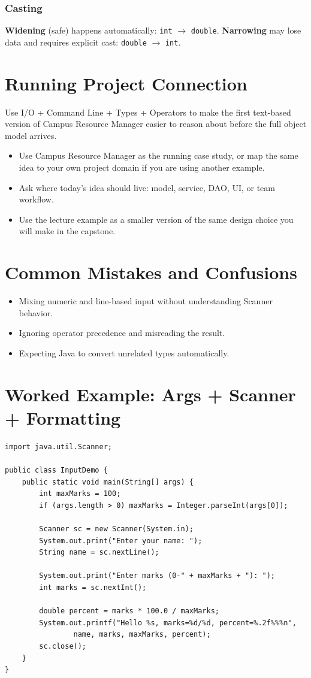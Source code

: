 \documentclass[11pt]{article}
\begin{document}
\subsubsection{Casting}
\textbf{Widening} (safe) happens automatically: \texttt{int} $\rightarrow$ \texttt{double}.
\textbf{Narrowing} may lose data and requires explicit cast: \texttt{double} $\rightarrow$ \texttt{int}.

\section{Running Project Connection}
Use I/O + Command Line + Types + Operators to make the first text-based version of Campus Resource Manager easier to reason about before the full object model arrives.
\begin{itemize}
  \item Use Campus Resource Manager as the running case study, or map the same idea to your own project domain if you are using another example.
  \item Ask where today's idea should live: model, service, DAO, UI, or team workflow.
  \item Use the lecture example as a smaller version of the same design choice you will make in the capstone.
\end{itemize}
\notesources{\OOPSUnitISources}

\section{Common Mistakes and Confusions}
\begin{itemize}
  \item Mixing numeric and line-based input without understanding Scanner behavior.
  \item Ignoring operator precedence and misreading the result.
  \item Expecting Java to convert unrelated types automatically.
\end{itemize}
\notesources{\OOPSUnitISources}

\section{Worked Example: Args + Scanner + Formatting}
\begin{lstlisting}
import java.util.Scanner;

public class InputDemo {
    public static void main(String[] args) {
        int maxMarks = 100;
        if (args.length > 0) maxMarks = Integer.parseInt(args[0]);

        Scanner sc = new Scanner(System.in);
        System.out.print("Enter your name: ");
        String name = sc.nextLine();

        System.out.print("Enter marks (0-" + maxMarks + "): ");
        int marks = sc.nextInt();

        double percent = marks * 100.0 / maxMarks;
        System.out.printf("Hello %s, marks=%d/%d, percent=%.2f%%%n",
                name, marks, maxMarks, percent);
        sc.close();
    }
}
\end{lstlisting}
\end{document}
